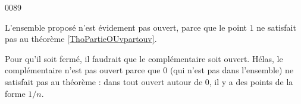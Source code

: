 
\begin{corrige}{0089}

L'ensemble proposé n'est évidement pas ouvert, parce que le point $1$ ne satisfait pas au théorème \ref{ThoPartieOUvpartouv}. 

Pour qu'il soit fermé, il faudrait que le complémentaire soit ouvert. Hélas, le complémentaire n'est pas ouvert parce que $0$ (qui n'est pas dans l'ensemble) ne satisfait pas au théorème : dans tout ouvert autour de $0$, il y a des points de la forme $1/n$.

\end{corrige}
